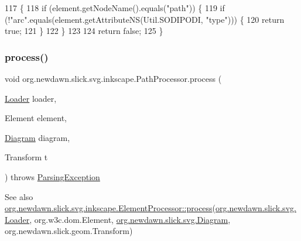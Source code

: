 \begin{DoxyCode}
117                                             \{
118         \textcolor{keywordflow}{if} (element.getNodeName().equals(\textcolor{stringliteral}{"path"})) \{
119             \textcolor{keywordflow}{if} (!\textcolor{stringliteral}{"arc"}.equals(element.getAttributeNS(Util.SODIPODI, \textcolor{stringliteral}{"type"}))) \{
120                 \textcolor{keywordflow}{return} \textcolor{keyword}{true};
121             \}
122         \}
123         
124         \textcolor{keywordflow}{return} \textcolor{keyword}{false};
125     \}
\end{DoxyCode}
\mbox{\label{classorg_1_1newdawn_1_1slick_1_1svg_1_1inkscape_1_1_path_processor_ad4019c7c724b673d4c4aaa23dd95e50e}} 
\subsubsection{\texorpdfstring{process()}{process()}}
{\footnotesize\ttfamily void org.\+newdawn.\+slick.\+svg.\+inkscape.\+Path\+Processor.\+process (\begin{DoxyParamCaption}\item[{\mbox{\hyperlink{interfaceorg_1_1newdawn_1_1slick_1_1svg_1_1_loader}{Loader}}}]{loader,  }\item[{Element}]{element,  }\item[{\mbox{\hyperlink{classorg_1_1newdawn_1_1slick_1_1svg_1_1_diagram}{Diagram}}}]{diagram,  }\item[{Transform}]{t }\end{DoxyParamCaption}) throws \mbox{\hyperlink{classorg_1_1newdawn_1_1slick_1_1svg_1_1_parsing_exception}{Parsing\+Exception}}\hspace{0.3cm}{\ttfamily [inline]}}

\begin{DoxySeeAlso}{See also}
\mbox{\hyperlink{interfaceorg_1_1newdawn_1_1slick_1_1svg_1_1inkscape_1_1_element_processor_acd170a9e1119481edae885780db59a2e}{org.\+newdawn.\+slick.\+svg.\+inkscape.\+Element\+Processor\+::process}}(\mbox{\hyperlink{interfaceorg_1_1newdawn_1_1slick_1_1svg_1_1_loader}{org.\+newdawn.\+slick.\+svg.\+Loader}}, org.\+w3c.\+dom.\+Element, \mbox{\hyperlink{classorg_1_1newdawn_1_1slick_1_1svg_1_1_diagram}{org.\+newdawn.\+slick.\+svg.\+Diagram}}, org.\+newdawn.\+slick.\+geom.\+Transform) 
\end{DoxySeeAlso}


